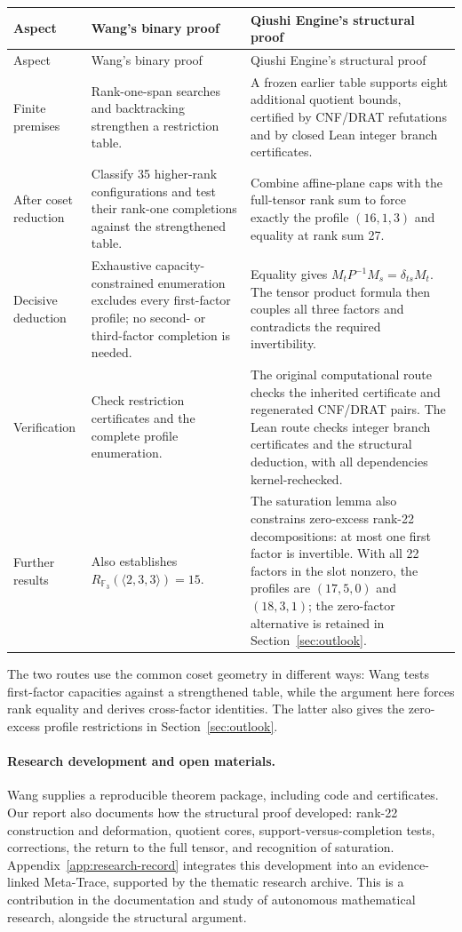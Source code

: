 \begin{longtable}{@{}L{2.1cm}L{5.7cm}L{6.4cm}@{}}
\toprule
Aspect & Wang's binary proof & Qiushi Engine's structural proof\\
\midrule
\endfirsthead
\toprule Aspect & Wang's binary proof & Qiushi Engine's structural proof\\\midrule
\endhead
\bottomrule\endfoot
Finite premises
& Rank-one-span searches and backtracking strengthen a restriction table.
& A frozen earlier table supports eight additional quotient bounds,
certified by CNF/DRAT refutations and by closed Lean integer branch
certificates.\\
After coset reduction
& Classify 35 higher-rank configurations and test their rank-one
completions against the strengthened table.
& Combine affine-plane caps with the full-tensor rank sum to force
exactly the profile $(16,1,3)$ and equality at rank sum 27.\\
Decisive deduction
& Exhaustive capacity-constrained enumeration excludes every first-factor
profile; no second- or third-factor completion is needed.
& Equality gives $M_tP^{-1}M_s=\delta_{ts}M_t$. The tensor product formula
then couples all three factors and contradicts the required invertibility.\\
Verification
& Check restriction certificates and the complete profile enumeration.
& The original computational route checks the inherited certificate and
regenerated CNF/DRAT pairs. The Lean route checks integer branch
certificates and the structural deduction, with all dependencies
kernel-rechecked.\\
Further results
& Also establishes $R_{\mathbb F_3}(\langle2,3,3\rangle)=15$.
& The saturation lemma also constrains zero-excess rank-22 decompositions:
at most one first factor is invertible. With all 22 factors in the slot
nonzero, the profiles are $(17,5,0)$ and $(18,3,1)$; the zero-factor
alternative is retained in Section~\ref{sec:outlook}.\\
\end{longtable}

The two routes use the common coset geometry in different ways: Wang tests
first-factor capacities against a strengthened table, while the argument
here forces rank equality and derives cross-factor identities. The latter
also gives the zero-excess profile restrictions in Section~\ref{sec:outlook}.

\paragraph{Research development and open materials.}
Wang supplies a reproducible theorem package, including code and
certificates. Our report also documents how the structural proof
developed: rank-22 construction and deformation, quotient cores,
support-versus-completion tests, corrections, the return to the full
tensor, and recognition of saturation. Appendix~\ref{app:research-record}
integrates this development into an evidence-linked Meta-Trace, supported
by the thematic research archive. This is a contribution in the
documentation and study of autonomous mathematical research, alongside
the structural argument.

